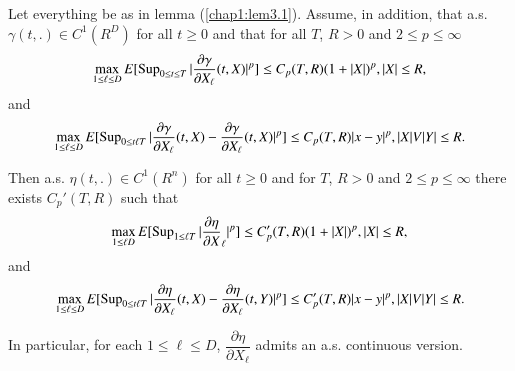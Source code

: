 \begin{lemma}\label{chap1:lem3.2} %
Let everything be as in lemma (\ref{chap1:lem3.1}). Assume, in addition, that
a.s. $\gamma (t,.) \in C^1 (R^D)$ for all $t \ge 0$ and that for all
$T$, $R >0$ and  $2 \le p \le \infty$ 
$$
\max_{1 \le \ell \le D} E[\operatorname{Sup}_{0 \leq t \leq T} |\frac{\partial
    \gamma}{\partial X_\ell} (t,X)|^p] \le C_p (T,R)(1+|X|)^p, |X| \le
R, 
$$ 
and 
{\fontsize{10pt}{12pt}\selectfont
$$
\max_{1 \le \ell \leq D} E[\operatorname{Sup}_{0 \le t \ell T} |\frac{\partial
    \gamma}{\partial X_\ell} (t,X)-\frac{\partial \gamma}{\partial
    X_\ell} (t,X)|^p] \leq C_p (T, R) | x-y|^p,  |X|V|Y| \leq R. 
$$}\relax

Then a.s. $\eta (t,.) \in C^1 (R^n)$ for all $t \ge 0$ and for $T$, $R
>0$ and $2 \le p \le \infty$ there exists $C_p'(T,R)$ such that 
$$
\max_{1 \le \ell D} E[\operatorname{Sup}_{1 \le \ell T} |\frac{\partial
    \eta}{\partial X}_\ell |^p ] \le C_p'(T,R) (1+ |X|)^p, |X| \le R, 
$$
and
{\fontsize{10pt}{12pt}\selectfont
$$
\max_{1 \le \ell \leq D} E[\operatorname{Sup}_{0 \le t \ell T} |\frac{\partial
    \eta}{\partial X_\ell} (t,X)-\frac{\partial \eta}{\partial X_\ell}
  (t,Y)|^p ] \le C_p'(T,R)|x-y|^p, |X|V|Y| \leq R. 
$$}\relax

In particular, for each $1 \le \ell \le D$, $\dfrac{\partial \eta}{
  \partial X_\ell}$ admits an a.s. continuous version. 
\end{lemma}

